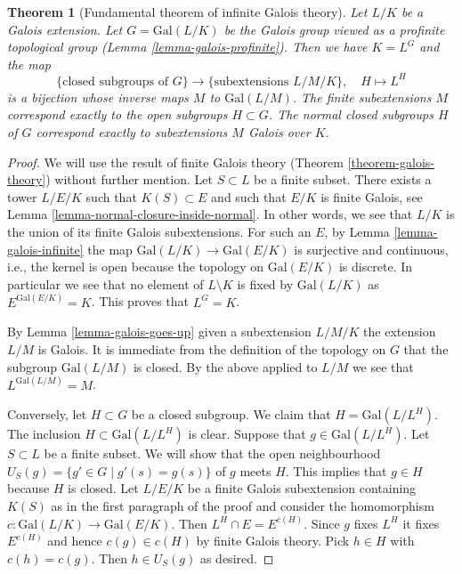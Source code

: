 \documentclass[10pt,a4paper]{amsart}
\theoremstyle{plain}
\newtheorem{theorem}[subsection]{Theorem}
\theoremstyle{definition}
\theoremstyle{remark}
\numberwithin{equation}{subsection}
\begin{document}
\begin{theorem}[Fundamental theorem of infinite Galois theory]
\label{theorem-inifinite-galois-theory}
Let $L/K$ be a Galois extension. Let $G = \text{Gal}(L/K)$
be the Galois group viewed as a profinite topological group
(Lemma \ref{lemma-galois-profinite}). Then we have $K = L^G$ and the map
$$
\{\text{closed subgroups of }G\}
\longrightarrow
\{\text{subextensions }L/M/K\},\quad
H \longmapsto L^H
$$
is a bijection whose inverse maps $M$ to $\text{Gal}(L/M)$.
The finite subextensions $M$ correspond exactly to the open
subgroups $H \subset G$. The normal closed subgroups $H$ of $G$
correspond exactly to subextensions $M$ Galois over $K$.
\end{theorem}

\begin{proof}
We will use the result of finite Galois theory
(Theorem \ref{theorem-galois-theory})
without further mention.
Let $S \subset L$ be a finite subset. There exists a tower
$L/E/K$ such that $K(S) \subset E$ and such that
$E/K$ is finite Galois, see Lemma \ref{lemma-normal-closure-inside-normal}.
In other words, we see that $L/K$ is the union of its finite
Galois subextensions.
For such an $E$, by Lemma \ref{lemma-galois-infinite}
the map $\text{Gal}(L/K) \to \text{Gal}(E/K)$ is surjective
and continuous, i.e., the kernel is open because the topology
on $\text{Gal}(E/K)$ is discrete.
In particular we see that no element of $L \setminus K$ is fixed by
$\text{Gal}(L/K)$ as $E^{\text{Gal}(E/K)} = K$.
This proves that $L^G = K$.

\medskip\noindent
By Lemma \ref{lemma-galois-goes-up} given a subextension $L/M/K$
the extension $L/M$ is Galois. It is immediate from the definition
of the topology on $G$ that the subgroup $\text{Gal}(L/M)$ is closed.
By the above applied to $L/M$ we see that $L^{\text{Gal}(L/M)} = M$.

\medskip\noindent
Conversely, let $H \subset G$ be a closed subgroup. We claim that
$H = \text{Gal}(L/L^H)$. The inclusion $H \subset \text{Gal}(L/L^H)$
is clear. Suppose that $g \in \text{Gal}(L/L^H)$. Let $S \subset L$
be a finite subset. We will show that the open neighbourhood
$U_S(g) = \{g' \in G \mid g'(s) = g(s)\}$ of $g$ meets $H$.
This implies that $g \in H$ because $H$ is closed.
Let $L/E/K$ be a finite Galois subextension containing $K(S)$
as in the first paragraph of the proof and consider the homomorphism
$c : \text{Gal}(L/K) \to \text{Gal}(E/K)$.
Then $L^H \cap E = E^{c(H)}$. Since $g$ fixes $L^H$ it fixes
$E^{c(H)}$ and hence $c(g) \in c(H)$ by finite Galois theory.
Pick $h \in H$ with $c(h) = c(g)$. Then $h \in U_S(g)$ as desired.


\end{proof}
\end{document}
